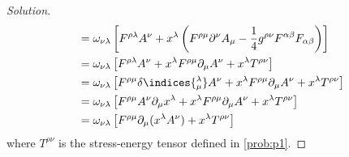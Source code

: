 \begin{proof}[Solution]
\begin{align*}
      &= \omega_{\nu \lambda}\left[F^{\rho \lambda} A^\nu + x^\lambda \left(F^{\rho \mu} \partial^\nu A_\mu - \frac14 g^{\rho \nu} F^{\alpha \beta} F_{\alpha \beta}\right)\right]\\
      &= \omega_{\nu \lambda} \left[F^{\rho \lambda} A^\nu + x^\lambda F^{\rho \mu} \partial_\mu A^\nu + x^\lambda T^{\rho \nu}\right]\\
      &= \omega_{\nu \lambda} \left[F^{\rho \mu} \delta\indices{^\lambda_\mu} A^\nu + x^\lambda F^{\rho \mu} \partial_\mu A^\nu + x^\lambda T^{\rho \nu}\right]\\
      &= \omega_{\nu \lambda} \left[F^{\rho \mu} A^\nu \partial_\mu x^\lambda + x^\lambda F^{\rho \mu} \partial_\mu A^\nu + x^\lambda T^{\rho \nu}\right]\\
      &= \omega_{\nu \lambda} \left[F^{\rho \mu} \partial_\mu( x^\lambda A^\nu) + x^\lambda T^{\rho \nu}\right]
   \end{align*}
   where \(T^{\rho\nu}\) is the stress-energy tensor defined in \cref{prob:p1}.
\end{proof}
